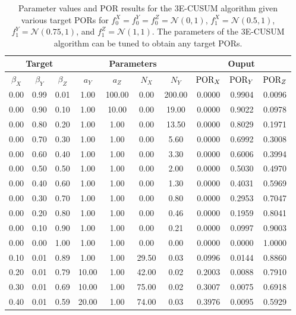 \documentclass[journal, onecolumn]{IEEEtran}
\begin{document}
\begin{table}[!th]
\renewcommand{\arraystretch}{1.0}
\caption{Parameter values and POR results for the 3E-CUSUM algorithm given various target PORs for $f_0^X = f_0^Y = f_0^Z = \mathcal{N}(0, 1)$, $f_1^X = \mathcal{N}(0.5, 1)$, $f_1^Y = \mathcal{N}(0.75, 1)$, and $f_1^Z = \mathcal{N}(1, 1)$. The parameters of the 3E-CUSUM algorithm can be tuned to obtain any target PORs.}
\label{tab:por-ts-sim}
\centering
\begin{tabular}{ccc|cccc|ccc}
\multicolumn{3}{c}{Target} & \multicolumn{4}{c}{Parameters} & \multicolumn{3}{c}{Ouput} \\
\hline
$\beta_X$ & $\beta_Y$ & $\beta_Z$ & $a_Y$ & $a_Z$ & $N_X$ & $N_Y$ & $\textup{POR}_X$ & $\textup{POR}_Y$ & $\textup{POR}_Z$ \\
\hline
0.00 & 0.99 & 0.01 & 1.00 & 100.00 & 0.00 & 200.00 & 0.0000 & 0.9904 & 0.0096 \\
0.00 & 0.90 & 0.10 & 1.00 & 10.00 & 0.00 & 19.00 & 0.0000 & 0.9022 & 0.0978 \\
0.00 & 0.80 & 0.20 & 1.00 & 1.00 & 0.00 & 13.50 & 0.0000 & 0.8029 & 0.1971 \\
0.00 & 0.70 & 0.30 & 1.00 & 1.00 & 0.00 & 5.60 & 0.0000 & 0.6992 & 0.3008 \\
0.00 & 0.60 & 0.40 & 1.00 & 1.00 & 0.00 & 3.30 & 0.0000 & 0.6006 & 0.3994 \\
0.00 & 0.50 & 0.50 & 1.00 & 1.00 & 0.00 & 2.00 & 0.0000 & 0.5030 & 0.4970 \\
0.00 & 0.40 & 0.60 & 1.00 & 1.00 & 0.00 & 1.30 & 0.0000 & 0.4031 & 0.5969 \\
0.00 & 0.30 & 0.70 & 1.00 & 1.00 & 0.00 & 0.80 & 0.0000 & 0.2953 & 0.7047 \\
0.00 & 0.20 & 0.80 & 1.00 & 1.00 & 0.00 & 0.46 & 0.0000 & 0.1959 & 0.8041 \\
0.00 & 0.10 & 0.90 & 1.00 & 1.00 & 0.00 & 0.21 & 0.0000 & 0.0997 & 0.9003 \\
0.00 & 0.00 & 1.00 & 1.00 & 1.00 & 0.00 & 0.00 & 0.0000 & 0.0000 & 1.0000 \\
\hline
0.10 & 0.01 & 0.89 & 1.00 & 1.00 & 29.50 & 0.03 & 0.0996 & 0.0144 & 0.8860 \\
0.20 & 0.01 & 0.79 & 10.00 & 1.00 & 42.00 & 0.02 & 0.2003 & 0.0088 & 0.7910 \\
0.30 & 0.01 & 0.69 & 10.00 & 1.00 & 75.00 & 0.02 & 0.3007 & 0.0075 & 0.6918 \\
0.40 & 0.01 & 0.59 & 20.00 & 1.00 & 74.00 & 0.03 & 0.3976 & 0.0095 & 0.5929 \\

\end{tabular}
\end{table}
\end{document}
